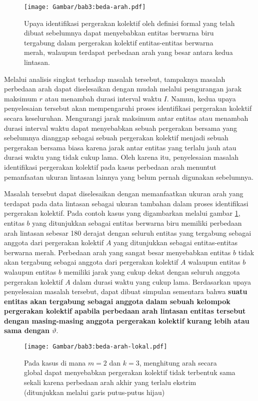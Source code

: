 \documentclass[a4paper,twoside]{article}
\begin{document}
\begin{figure}[t]
    \centering
    \texttt{[image: Gambar/bab3:beda-arah.pdf]}
    \caption[Kasus perbedaan arah]{Upaya identifikasi pergerakan kolektif oleh definisi formal yang telah dibuat sebelumnya dapat menyebabkan entitas berwarna biru tergabung dalam pergerakan kolektif entitas-entitas berwarna merah, walaupun terdapat perbedaan arah yang besar antara kedua lintasan.}
    \label{bab3:masalah-arah}
\end{figure}

Melalui analisis singkat terhadap masalah tersebut, tampaknya masalah perbedaan arah dapat diselesaikan dengan mudah melalui pengurangan jarak maksimum $r$ atau menambah durasi interval waktu $I$. Namun, kedua upaya penyelesaian tersebut akan mempengaruhi proses identifikasi pergerakan kolektif secara keseluruhan. Mengurangi jarak maksimum antar entitas atau menambah durasi interval waktu dapat menyebabkan sebuah pergerakan bersama yang sebelumnya dianggap sebagai sebuah pergerakan kolektif menjadi sebuah pergerakan bersama biasa karena jarak antar entitas yang terlalu jauh atau durasi waktu yang tidak cukup lama. Oleh karena itu, penyelesaian masalah identifikasi pergerakan kolektif pada kasus perbedaan arah menuntut pemanfaatan ukuran lintasan lainnya yang belum pernah digunakan sebelumnya.
    
Masalah tersebut dapat diselesaikan dengan memanfaatkan ukuran arah yang terdapat pada data lintasan sebagai ukuran tambahan dalam proses identifikasi pergerakan kolektif. Pada contoh kasus yang digambarkan melalui gambar \ref{bab3:masalah-arah}, entitas $b$ yang ditunjukkan sebagai entitas berwarna biru memiliki perbedaan arah lintasan sebesar 180 derajat dengan seluruh entitas yang tergabung sebagai anggota dari pergerakan kolektif $A$ yang ditunjukkan sebagai entitas-entitas berwarna merah. Perbedaan arah yang sangat besar menyebabkan entitas $b$ tidak akan tergabung sebagai anggota dari pergerakan kolektif $A$ walaupun entitas $b$ walaupun entitas $b$ memiliki jarak yang cukup dekat dengan seluruh anggota pergerakan kolektif $A$ dalam durasi waktu yang cukup lama. Berdasarkan upaya penyelesaian masalah tersebut, dapat dibuat simpulan sementara bahwa \textbf{suatu entitas akan tergabung sebagai anggota dalam sebuah kelompok pergerakan kolektif apabila perbedaan arah lintasan entitas tersebut dengan masing-masing anggota pergerakan kolektif kurang lebih atau sama dengan $\vartheta$}.

\begin{figure}[t]
    \centering
    \texttt{[image: Gambar/bab3:beda-arah-lokal.pdf]}
    \caption{Pada kasus di mana $m = 2$ dan $k = 3$, menghitung arah secara global dapat menyebabkan pergerakan kolektif tidak terbentuk sama sekali karena perbedaan arah akhir yang terlalu ekstrim (ditunjukkan melalui garis putus-putus hijau)}
    \label{bab3:beda-arah-lokal}
\end{figure}
\end{document}
